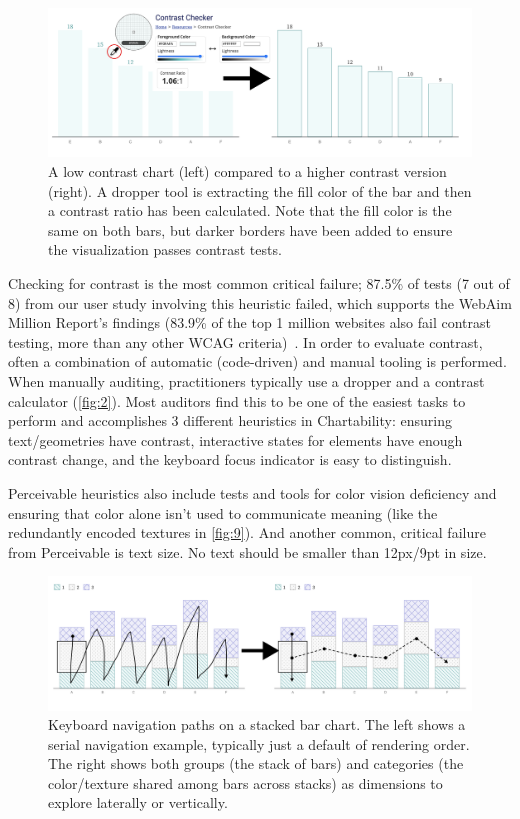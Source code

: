 \documentclass{egpubl}
\begin{document}
\begin{figure}
    \centering
    \includegraphics[width=\linewidth]{figures/figure 2.png}
    \caption{A low contrast chart (left) compared to a higher contrast version (right). A dropper tool is extracting the fill color of the bar and then a contrast ratio has been calculated. Note that the fill color is the same on both bars, but darker borders have been added to ensure the visualization passes contrast tests.}
    \label{fig:2}
\end{figure}

Checking for contrast is the most common critical failure; 87.5\% of tests (7 out of 8) from our user study involving this heuristic failed, which supports the WebAim Million Report’s findings (83.9\% of the top 1 million websites also fail contrast testing, more than any other WCAG criteria)~\cite{noauthor_webaim_nodate}. In order to evaluate contrast, often a combination of automatic (code-driven) and manual tooling is performed. When manually auditing, practitioners typically use a dropper and a contrast calculator (\autoref{fig:2}). Most auditors find this to be one of the easiest tasks to perform and accomplishes 3 different heuristics in Chartability: ensuring text/geometries have contrast, interactive states for elements have enough contrast change, and the keyboard focus indicator is easy to distinguish. 

Perceivable heuristics also include tests and tools for color vision deficiency and ensuring that color alone isn't used to communicate meaning (like the redundantly encoded textures in \autoref{fig:9}). And another common, critical failure from Perceivable is text size. No text should be smaller than 12px/9pt in size.

\begin{figure}
    \centering
    \includegraphics[width=\linewidth]{figures/figure 3.png}
    \caption{Keyboard navigation paths on a stacked bar chart. The left shows a serial navigation example, typically just a default of rendering order. The right shows both groups (the stack of bars) and categories (the color/texture shared among bars across stacks) as dimensions to explore laterally or vertically.}
    \label{fig:3}
\end{figure}
\end{document}

